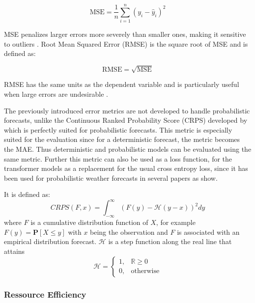 \documentclass{article}
\begin{document}
\begin{equation}
\text{MSE} = \frac{1}{n} \sum_{i=1}^{n} (y_i - \hat{y}_i)^2
\end{equation}

MSE penalizes larger errors more severely than smaller ones, making it sensitive to outliers \cite{MSE}.
Root Mean Squared Error (RMSE) is the square root of MSE and is defined as:

\begin{equation}
\text{RMSE} = \sqrt{\text{MSE}}
\end{equation}

RMSE has the same units as the dependent variable and is particularly useful when large errors are undesirable \cite{MAE_RMSE}.\par 

The previously introduced error metrics are not developed to handle probabilistic forecasts, unlike the Continuous Ranked Probability Score (CRPS) developed by \cite{Loss_Function} which is perfectly suited for probabilistic forecasts. This metric is especially suited for the evaluation since for a deterministic forecast, the metric becomes the MAE. Thus deterministic and probabilistic models can be evaluated using the same metric. Further this metric can also be used as a loss function, for the transformer models as a replacement for the usual cross entropy loss, since it has been used for probabilistic weather forecasts in several papers as \cite{CRPS_example_1, CRPS_example_2, CRPS_example_3} show. \par 
It is defined as:
\begin{equation}
    CRPS(F, x) = \int_{-\infty}^{\infty} ( F(y) - \mathcal{H}(y-x) )^{2} dy
\end{equation}
where $F$ is a cumulative distribution function of $X$, for example $F(y) = \mathbf{P}[X \leq y]$ with $x$ being the observation and $F$ is associated with an empirical distribution forecast. $\mathcal{H}$ is a step function along the real line that attains
\begin{equation}
    \mathcal{H} = \begin{cases}
        1, & \mathbb{R} \geq 0 \\
        0, & \text{otherwise}
    \end{cases}
\end{equation}

\subsubsection{Ressource Efficiency}
\end{document}
